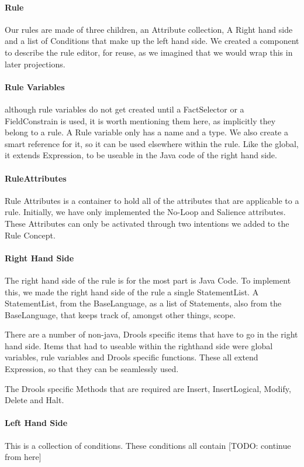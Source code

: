 \paragraph{Rule} Our rules are made of three children, an Attribute collection, A Right hand side and a list of Conditions that make up the left hand side.
We created a component to describe the rule editor, for reuse, as we imagined that we would wrap this in later projections.

\paragraph{Rule Variables} although rule variables do not get created until a FactSelector or a FieldConstrain is used, it is worth mentioning them here, as implicitly they belong to a rule.
A Rule variable only has a name and a type.
We also create a smart reference for it, so it can be used elsewhere within the rule.
Like the global, it extends Expression, to be useable in the Java code of the right hand side.

\paragraph{RuleAttributes} Rule Attributes is a container to hold all of the attributes that are applicable to a rule.
Initially, we have only implemented the No-Loop and Salience attributes.
These Attributes can only be activated through two intentions we added to the Rule Concept.

\paragraph{Right Hand Side}
The right hand side of the rule is for the most part is Java Code.  
To implement this, we made the right hand side of the rule a single StatementList.
A StatementList, from the BaseLanguage, as a list of Statements, also from the BaseLanguage, that keeps track of, amongst other things, scope.

There are a number of non-java, Drools specific items that have to go in the right hand side.
Items that had to useable within the righthand side were global variables, rule variables and Drools specific functions.
These all extend Expression, so that they can be seamlessly used.

The Drools specific Methods that are required are Insert, InsertLogical, Modify, Delete and Halt.

\paragraph{Left Hand Side} This is a collection of conditions.  
These conditions all contain  [TODO: continue from here]
